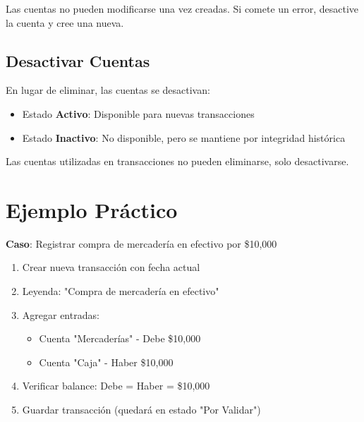 \begin{notebox}
Las cuentas no pueden modificarse una vez creadas. Si comete un error, desactive la cuenta y cree una nueva.
\end{notebox}

\subsection{Desactivar Cuentas}

En lugar de eliminar, las cuentas se desactivan:
\begin{itemize}
    \item Estado \textbf{Activo}: Disponible para nuevas transacciones
    \item Estado \textbf{Inactivo}: No disponible, pero se mantiene por integridad histórica
\end{itemize}

\begin{warningbox}
Las cuentas utilizadas en transacciones no pueden eliminarse, solo desactivarse.
\end{warningbox}

\section{Ejemplo Práctico}

\textbf{Caso}: Registrar compra de mercadería en efectivo por \$10,000

\begin{enumerate}
    \item Crear nueva transacción con fecha actual
    \item Leyenda: "Compra de mercadería en efectivo"
    \item Agregar entradas:
    \begin{itemize}
        \item Cuenta "Mercaderías" - Debe \$10,000
        \item Cuenta "Caja" - Haber \$10,000
    \end{itemize}
    \item Verificar balance: Debe = Haber = \$10,000
    \item Guardar transacción (quedará en estado "Por Validar")
\end{enumerate}